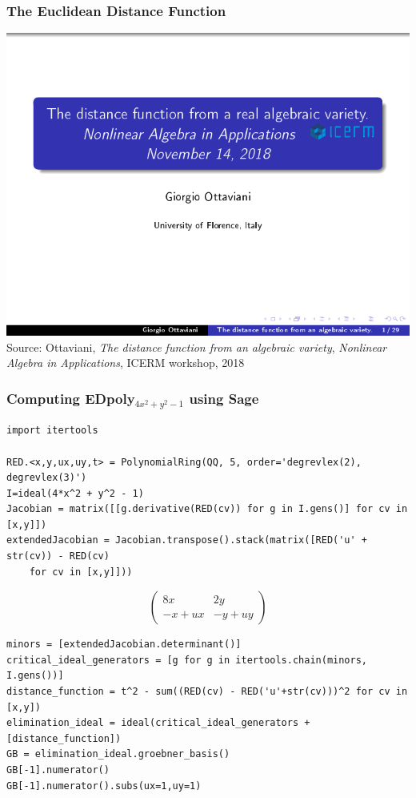 \documentclass{beamer}
\begin{document}
\begin{frame}
\frametitle{The Euclidean Distance Function}
\includegraphics[page=16, clip, trim=0in 0in 0in 0in, width=\textwidth]{The_distance_function_from_a_real_algebraic_variety_]_Giorgio_Ottaviani,_University_of_Florence.pdf}
Source: Ottaviani, {\it The distance function from an algebraic variety}, {\it Nonlinear Algebra in Applications}, ICERM workshop, 2018
\end{frame}

\begin{frame}[fragile]
\frametitle{Computing EDpoly$_{4x^2+y^2-1}$ using Sage}
\scriptsize
\begin{verbatim}
import itertools

RED.<x,y,ux,uy,t> = PolynomialRing(QQ, 5, order='degrevlex(2), degrevlex(3)')
I=ideal(4*x^2 + y^2 - 1)
Jacobian = matrix([[g.derivative(RED(cv)) for g in I.gens()] for cv in [x,y]])
extendedJacobian = Jacobian.transpose().stack(matrix([RED('u' + str(cv)) - RED(cv)
    for cv in [x,y]]))
\end{verbatim}
\[
\left(\begin{array}{rr}
8 x & 2 y \\
-x + \mathit{ux} & -y + \mathit{uy}
\end{array}\right)
\]
\begin{verbatim}
minors = [extendedJacobian.determinant()]
critical_ideal_generators = [g for g in itertools.chain(minors, I.gens())]
distance_function = t^2 - sum((RED(cv) - RED('u'+str(cv)))^2 for cv in [x,y])
elimination_ideal = ideal(critical_ideal_generators + [distance_function])
GB = elimination_ideal.groebner_basis()
GB[-1].numerator()
GB[-1].numerator().subs(ux=1,uy=1)
\end{verbatim}
\end{frame}
\end{document}
